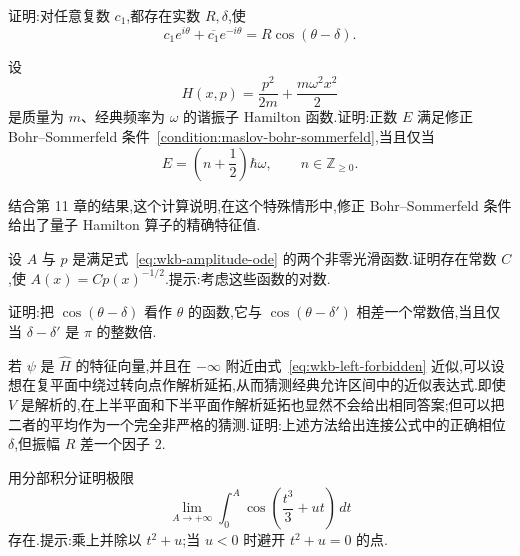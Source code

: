 \begin{exercise}[复指数的余弦表示]\label{ex:wkb-cosine-combination}
证明:对任意复数 $c_1$,都存在实数 $R,\delta$,使
\[
c_1e^{i\theta}+\overline{c_1}e^{-i\theta}=R\cos(\theta-\delta).
\]
\end{exercise}

\begin{exercise}\label{ex:wkb-harmonic-bohr-sommerfeld}
设
\[
H(x,p)=\frac{p^2}{2m}+\frac{m\omega^2x^2}{2}
\]
是质量为 $m$、经典频率为 $\omega$ 的谐振子 Hamilton 函数.证明:正数 $E$ 满足修正 Bohr--Sommerfeld 条件~\ref{condition:maslov-bohr-sommerfeld},当且仅当
\[
E=\left(n+\frac12\right)\hbar\omega,
\qquad n\in\mathbb Z_{\geq0}.
\]
\begin{note}[说明]\label{note:wkb-harmonic-exact}
结合第 11 章的结果,这个计算说明,在这个特殊情形中,修正 Bohr--Sommerfeld 条件给出了量子 Hamilton 算子的精确特征值.
\end{note}
\end{exercise}

\begin{exercise}\label{ex:wkb-amplitude}
设 $A$ 与 $p$ 是满足式~\eqref{eq:wkb-amplitude-ode} 的两个非零光滑函数.证明存在常数 $C$,使 $A(x)=C p(x)^{-1/2}$.提示:考虑这些函数的对数.
\end{exercise}

\begin{exercise}[余弦相位的唯一性]\label{ex:wkb-phase}
证明:把 $\cos(\theta-\delta)$ 看作 $\theta$ 的函数,它与 $\cos(\theta-\delta')$ 相差一个常数倍,当且仅当 $\delta-\delta'$ 是 $\pi$ 的整数倍.
\end{exercise}

\begin{exercise}[解析延拓的振幅误差]\label{ex:wkb-analytic-continuation}
若 $\psi$ 是 $\widehat H$ 的特征向量,并且在 $-\infty$ 附近由式~\eqref{eq:wkb-left-forbidden} 近似,可以设想在复平面中绕过转向点作解析延拓,从而猜测经典允许区间中的近似表达式.即使 $V$ 是解析的,在上半平面和下半平面作解析延拓也显然不会给出相同答案;但可以把二者的平均作为一个完全非严格的猜测.证明:上述方法给出连接公式中的正确相位 $\delta$,但振幅 $R$ 差一个因子 $2$.
\end{exercise}

\begin{exercise}\label{ex:airy-convergence}
用分部积分证明极限
\[
\lim_{A\to+\infty}\int_0^A\cos\left(\frac{t^3}{3}+ut\right)\,dt
\]
存在.提示:乘上并除以 $t^2+u$;当 $u<0$ 时避开 $t^2+u=0$ 的点.
\end{exercise}

